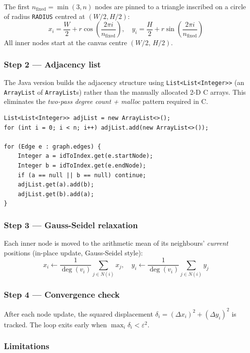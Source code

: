 \documentclass[12pt,a4paper]{article}
\begin{document}
The first $n_{\text{fixed}} = \min(3, n)$ nodes are pinned to a triangle
inscribed on a circle of radius \texttt{RADIUS} centred at $(W/2, H/2)$:
\[
  x_i = \frac{W}{2} + r\cos\!\left(\frac{2\pi i}{n_{\text{fixed}}}\right), \quad
  y_i = \frac{H}{2} + r\sin\!\left(\frac{2\pi i}{n_{\text{fixed}}}\right)
\]
All inner nodes start at the canvas centre $(W/2,\, H/2)$.

\subsubsection*{Step 2 — Adjacency list}

The Java version builds the adjacency structure using
\texttt{List<List<Integer>>} (an \texttt{ArrayList} of \texttt{ArrayList}s)
rather than the manually allocated 2-D C arrays. This eliminates the
\textit{two-pass degree count + malloc} pattern required in C.

\begin{lstlisting}[caption={Adjacency list construction}]
List<List<Integer>> adjList = new ArrayList<>();
for (int i = 0; i < n; i++) adjList.add(new ArrayList<>());

for (Edge e : graph.edges) {
    Integer a = idToIndex.get(e.startNode);
    Integer b = idToIndex.get(e.endNode);
    if (a == null || b == null) continue;
    adjList.get(a).add(b);
    adjList.get(b).add(a);
}
\end{lstlisting}

\subsubsection*{Step 3 — Gauss-Seidel relaxation}

Each inner node is moved to the arithmetic mean of its neighbours'
\emph{current} positions (in-place update, Gauss-Seidel style):
\[
  x_i \leftarrow \frac{1}{\deg(v_i)} \sum_{j \in N(i)} x_j, \quad
  y_i \leftarrow \frac{1}{\deg(v_i)} \sum_{j \in N(i)} y_j
\]

\subsubsection*{Step 4 — Convergence check}

After each node update, the squared displacement $\delta_i = (\Delta x_i)^2 +
(\Delta y_i)^2$ is tracked. The loop exits early when
$\max_i \delta_i < \varepsilon^2$.

\subsubsection*{Limitations}
\end{document}
